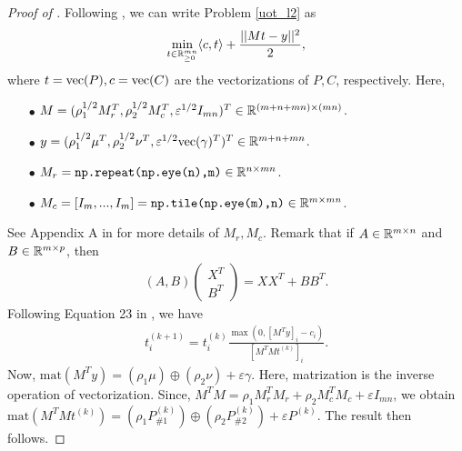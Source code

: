 \begin{proof}[Proof of ]
Following \citep{Chapel21}, we can write Problem \eqref{uot_l2} as
\begin{align}
    \min_{t \in \mathbb R^{mn}_{\geq 0}} \langle c, t \rangle + \frac{|| Mt - y ||^2}{2},
\end{align}
where $t = \text{vec}(P), c = \text{vec}(C)$ are the vectorizations of $P, C$, respectively. Here,
\begin{itemize}
    \item[$\bullet$] $M = (\rho_1^{1/2} M_r^T, \rho_2^{1/2} M_c^T, \varepsilon^{1/2} I_{mn})^T \in \mathbb R^{(m + n + mn) \times (mn)}$.

    \item[$\bullet$] $y = (\rho_1^{1/2} \mu^T, \rho_2^{1/2} \nu^T, \varepsilon^{1/2} \text{vec}(\gamma)^T)^T \in \mathbb R^{m + n + mn}$.

    \item[$\bullet$] $M_r = \texttt{np.repeat(np.eye(n),m)} \in \mathbb R^{n \times mn}$.

    \item[$\bullet$] $M_c = [I_m, ..., I_m] = \texttt{np.tile(np.eye(m),n)} \in \mathbb R^{m \times mn}$.
\end{itemize}
See Appendix A in \citep{Chapel21} for more details of $M_r, M_c$.
Remark that if $A \in \mathbb R^{m \times n}$ and $B \in \mathbb R^{m \times p}$, then
\begin{align}
    (A, B) \begin{pmatrix}
        X^T \\
        B^T
    \end{pmatrix}
    = X X^T + B B^T.
\end{align}
Following Equation 23 in \citep{Chapel21},  we have
\begin{align}
    t^{(k+1)}_i = t^{(k)}_i \frac{\max( 0, [M^T y]_i - c_i)}{[M^T M t^{(k)}]_i}.
\end{align}
Now, $\text{mat}(M^T y) = (\rho_1 \mu) \oplus (\rho_2 \nu) + \varepsilon \gamma$.
Here, matrization is the inverse operation of vectorization. Since,
$M^T M = \rho_1 M_r^T M_r + \rho_2 M_c^T M_c + \varepsilon I_{mn}$, we obtain
$\text{mat}(M^T M t^{(k)}) = (\rho_1 P_{\# 1}^{(k)}) \oplus (\rho_2 P_{\# 2}^{(k)})
+ \varepsilon P^{(k)} $. The result then follows.
\end{proof}

